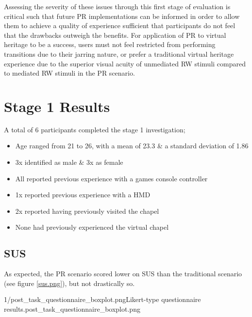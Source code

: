 Assessing the severity of these issues through this first stage of evaluation is critical such that future PR implementations can be informed in order to allow them to achieve a quality of experience sufficient that participants do not feel that the drawbacks outweigh the benefits. For application of PR to virtual heritage to be a success, users must not feel restricted from performing transitions due to their jarring nature, or prefer a traditional virtual heritage experience due to the superior visual acuity of unmediated RW stimuli compared to mediated RW stimuli in the PR scenario.


\section{Stage 1 Results}

A total of 6 participants completed the stage 1 investigation;
\begin{itemize}
	\item Age ranged from 21 to 26, with a mean of 23.3 \& a standard deviation of 1.86
	\item 3x identified as male \& 3x as female
	\item All reported previous experience with a games console controller
	\item 1x reported previous experience with a HMD
	\item 2x reported having previously visited the chapel
	\item None had previously experienced the virtual chapel
\end{itemize}


\subsection{SUS}
As expected, the PR scenario scored lower on SUS than the traditional scenario (see figure \ref{sus.png}), but not drastically so.

       {1/post_task_questionnaire_boxplot.png}{Likert-type questionnaire results.}{post_task_questionnaire_boxplot.png}


